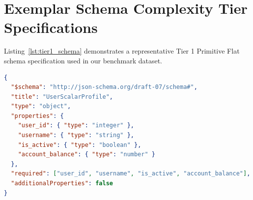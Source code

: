 \documentclass[10pt,journal,compsoc]{IEEEtran}
\begin{document}
\section{Exemplar Schema Complexity Tier Specifications}
Listing~\ref{lst:tier1_schema} demonstrates a representative Tier 1 Primitive Flat schema specification used in our benchmark dataset.

\begin{lstlisting}[language=json, float=tb, caption={Exemplar Tier 1 Primitive Flat Schema Specification.}, label={lst:tier1_schema}]
{
  "$schema": "http://json-schema.org/draft-07/schema#",
  "title": "UserScalarProfile",
  "type": "object",
  "properties": {
    "user_id": { "type": "integer" },
    "username": { "type": "string" },
    "is_active": { "type": "boolean" },
    "account_balance": { "type": "number" }
  },
  "required": ["user_id", "username", "is_active", "account_balance"],
  "additionalProperties": false
}
\end{lstlisting}

\nocite{shao2023omniquant}


\end{document}
